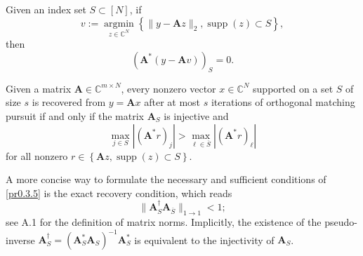 \begin{lemma}
    \label{lm0.3.1}
    Given an index set $S \subset [N]$, if 
    \[
        v := \mathop{\mathrm{argmin}}\limits_{z \in \mathbb{C}^N} \left\{ \|y - \mathbf{A}z\|_2, \mathop{\mathrm{supp}}(z) \subset S \right\},
    \]
    then 
    \begin{equation}
        (\mathbf{A}^*(y - \mathbf{A}v))_S = 0.
        \label{eq0.3.5}
    \end{equation}
\end{lemma}

\begin{proposition}
    \label{pr0.3.5}
    Given a matrix $\mathbf{A} \in \mathbb{C}^{m \times N}$, every nonzero vector $x \in \mathbb{C}^N$ supported on a set $S$ of size $s$ is recovered from $y = \mathbf{A}x$ after at most $s$ iterations of orthogonal matching pursuit if and only if the matrix $\mathbf{A}_S$ is injective and 
    \begin{equation}
        \max\limits_{j \in S}\left|(\mathbf{A}^*r)_j\right| > \max\limits_{\ell \in \overline{S}} \left|(\mathbf{A}^*r)_{\ell}\right|
        \label{eq0.3.6}
    \end{equation}
    for all nonzero $r \in \left\{ \mathbf{A}z, \mathop{\mathrm{supp}}(z) \subset S \right\}$.
\end{proposition}

\begin{remark}
    \label{rmk0.3.6}
    A more concise way to formulate the necessary and sufficient conditions of \cref{pr0.3.5} is the \textcolor[rgb]{1,0,0}{exact recovery condition}, which reads
    \begin{equation}
        \|\mathbf{A}_S^{\dagger}\mathbf{A}_{\overline{S}}\|_{1 \rightarrow 1} < 1;
        \label{eq0.3.7}
    \end{equation}
    see A.1 for the definition of matrix norms. Implicitly, the existence of the pseudo-inverse $\mathbf{A}_S^{\dagger} = (\mathbf{A}_S^*\mathbf{A}_S)^{-1} \mathbf{A}_S^*$ is equivalent to the injectivity of $\mathbf{A}_S$. 
\end{remark}

